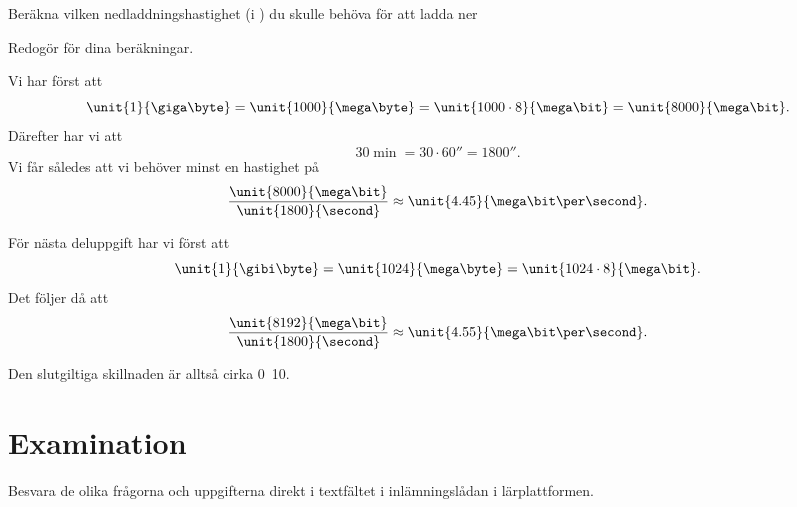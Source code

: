 \documentclass[11pt,a4paper]{miunasgn}
\begin{document}
\begin{questions}
\question
Beräkna vilken nedladdningshastighet (i \mega\bit\per\second) du skulle behöva 
för att ladda
ner

Redogör för dina beräkningar.
\begin{solution}
	Vi har först att \[
		\unit{1}{\giga\byte} = \unit{1000}{\mega\byte} =
		\unit{1000\cdot 8}{\mega\bit} = \unit{8000}{\mega\bit}.
	\]
	Därefter har vi att \[
		\unit{30}{\min} = \unit{30\cdot 60}{\second} =
		\unit{1800}{\second}.
	\]
	Vi får således att vi behöver minst en hastighet på \[
		\frac{\unit{8000}{\mega\bit}}{\unit{1800}{\second}} \approx
		\unit{4.45}{\mega\bit\per\second}.
	\]

	För nästa deluppgift har vi först att \[
		\unit{1}{\gibi\byte} = \unit{1024}{\mega\byte} =
		\unit{1024\cdot 8}{\mega\bit}.
	\]
	Det följer då att \[
		\frac{\unit{8192}{\mega\bit}}{\unit{1800}{\second}} \approx
		\unit{4.55}{\mega\bit\per\second}.
	\]

	Den slutgiltiga skillnaden är alltså cirka \unit{0.10}{\mega\bit\per\second}.
\end{solution}

\end{questions}


\section{Examination}
\label{sec:Examination}
\noindent
Besvara de olika frågorna och uppgifterna direkt i textfältet i inlämningslådan 
i lärplattformen.



\end{document}
